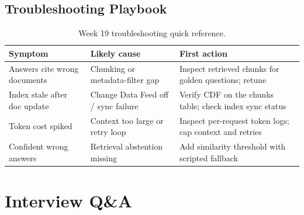 \subsection{Troubleshooting Playbook}
\begin{table}[H]
\centering
\small
\begin{tabular}{@{}p{3.6cm}p{4.2cm}p{4.8cm}@{}}
\toprule
\textbf{Symptom} & \textbf{Likely cause} & \textbf{First action} \\
\midrule
Answers cite wrong documents & Chunking or metadata-filter gap & Inspect retrieved chunks for golden questions; retune \\
Index stale after doc update & Change Data Feed off / sync failure & Verify CDF on the chunks table; check index sync status \\
Token cost spiked & Context too large or retry loop & Inspect per-request token logs; cap context and retries \\
Confident wrong answers & Retrieval abstention missing & Add similarity threshold with scripted fallback \\
\bottomrule
\end{tabular}
\caption{Week 19 troubleshooting quick reference.}
\label{tab:ch19-trouble}
\end{table}

\section{Interview Q\&A}
